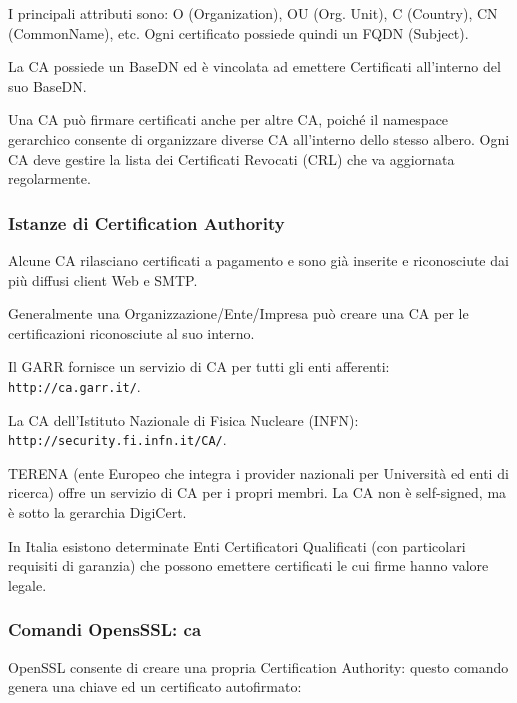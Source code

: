             I principali attributi sono: O (Organization), OU (Org. Unit), C (Country), CN (CommonName), etc. Ogni certificato possiede quindi un FQDN (Subject).
        
            La CA possiede un BaseDN ed è vincolata ad emettere Certificati all'interno del suo BaseDN.
        
            Una CA può firmare certificati anche per altre CA, poiché il namespace gerarchico consente di organizzare diverse CA all'interno dello stesso albero. Ogni CA deve gestire la lista dei Certificati Revocati (CRL) che va aggiornata regolarmente.

        \subsubsection{Istanze di Certification Authority}
            Alcune CA rilasciano certificati a pagamento e sono già inserite e riconosciute dai più diffusi client Web e SMTP.
        
            Generalmente una Organizzazione/Ente/Impresa può creare una CA per le certificazioni riconosciute al suo interno.
        
            Il GARR fornisce un servizio di CA per tutti gli enti afferenti:\\\verb|http://ca.garr.it/|.
        
            La CA dell'Istituto Nazionale di Fisica Nucleare (INFN):\\\verb|http://security.fi.infn.it/CA/|.
        
            TERENA (ente Europeo che integra i provider nazionali per Università ed enti di ricerca) offre un servizio di CA per i propri membri. La CA non è self-signed, ma è sotto la gerarchia DigiCert.
        
            In Italia esistono determinate Enti Certificatori Qualificati (con particolari requisiti di garanzia) che possono emettere certificati le cui firme hanno valore legale.

        \subsubsection{Comandi OpensSSL: ca}
            OpenSSL consente di creare una propria Certification Authority: questo comando genera una chiave ed un certificato autofirmato:

            

